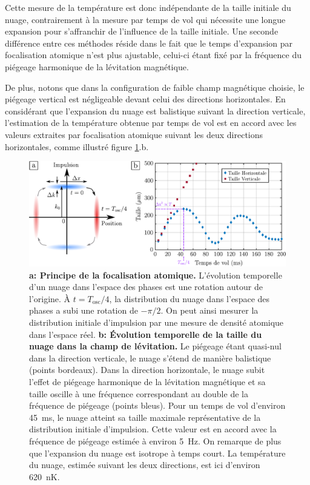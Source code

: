 Cette mesure de la température est donc indépendante de la taille initiale du nuage, contrairement à la mesure par temps de vol qui nécessite une longue expansion pour s'affranchir de l'influence de la taille initiale. Une seconde différence entre ces méthodes réside dans le fait que le temps d'expansion par focalisation atomique n'est plus ajustable, celui-ci étant fixé par la fréquence du piégeage harmonique de la lévitation magnétique. 

De plus, notons que dans la configuration de faible champ magnétique choisie, le piégeage vertical est négligeable devant celui des directions horizontales. En considérant que l'expansion du nuage est balistique suivant la direction verticale, l'estimation de la température obtenue par temps de vol est en accord avec les valeurs extraites par focalisation atomique suivant les deux directions horizontales, comme illustré figure \ref{fig:focalisation_atomique}.b.

\begin{figure}
\centering
\includegraphics[width=\textwidth]{Fig/Modif_exp/focalisation_atomique.pdf}
\caption{\textbf{a: Principe de la focalisation atomique.} L'évolution temporelle d'un nuage dans l'espace des phases est une rotation autour de l'origine. À $t=T_{\mathrm{osc}}/4$, la distribution du nuage dans l'espace des phases a subi une rotation de $-\pi/2$. On peut ainsi mesurer la distribution initiale d'impulsion par une mesure de densité atomique dans l'espace réel. \textbf{b: Évolution temporelle de la taille du nuage dans la champ de lévitation.} Le piégeage étant quasi-nul dans la direction verticale, le nuage s'étend de manière balistique (points bordeaux). Dans la direction horizontale, le nuage subit l'effet de piégeage harmonique de la lévitation magnétique et sa taille oscille à une fréquence correspondant au double de la fréquence de piégeage (points bleus). Pour un temps de vol d'environ \SI{45}{\milli\second}, le nuage atteint sa taille maximale représentative de la distribution initiale d'impulsion. Cette valeur est en accord avec la fréquence de piégeage estimée à environ \SI{5}{\hertz}. On remarque de plus que l'expansion du nuage est isotrope à temps court. La température du nuage, estimée suivant les deux directions, est ici d'environ \SI{620}{\nano\kelvin}.}
\label{fig:focalisation_atomique}
\end{figure}




